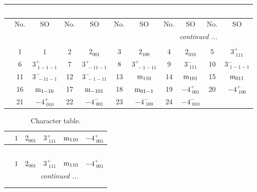 \documentclass[fleqn,10pt,landscape]{article}
\begin{document}
\begin{itemize}
\begin{center}
\begin{longtable}{c|cc|cc|cc|cc|cc}
\multicolumn{10}{l}{\tablename\ \thetable{}} \\
 \hline \hline
 & No. & SO & No. & SO & No. & SO & No. & SO & No. & SO \\ \hline \endhead

 \hline \hline
\multicolumn{10}{r}{\footnotesize\it continued ...} \\ \endfoot

 \hline \hline
\multicolumn{10}{r}{} \\ \endlastfoot

 & 1 & $1$ & 2 & $2{}_{001}$ & 3 & $2{}_{100}$ & 4 & $2{}_{010}$ & 5 & $3^{+}_{\,\,111}$ \\
& 6 & $3^{+}_{\,\,1-1-1}$ & 7 & $3^{+}_{\,\,-11-1}$ & 8 & $3^{+}_{\,\,-1-11}$ & 9 & $3^{-}_{\,\,111}$ & 10 & $3^{-}_{\,\,1-1-1}$ \\
& 11 & $3^{-}_{\,\,-11-1}$ & 12 & $3^{-}_{\,\,-1-11}$ & 13 & ${\rm m}_{110}$ & 14 & ${\rm m}_{101}$ & 15 & ${\rm m}_{011}$ \\
& 16 & ${\rm m}_{1-10}$ & 17 & ${\rm m}_{-101}$ & 18 & ${\rm m}_{01-1}$ & 19 & $-4^{+}_{\,\,001}$ & 20 & $-4^{+}_{\,\,100}$ \\
& 21 & $-4^{+}_{\,\,010}$ & 22 & $-4^{-}_{\,\,001}$ & 23 & $-4^{-}_{\,\,100}$ & 24 & $-4^{-}_{\,\,010}$ &  &  \\
\end{longtable}
\end{center}
\begin{center}
\renewcommand{\arraystretch}{1.0}
\begin{longtable}{c|rrrrr}
\caption{Character table.}
 \\
 \hline \hline
 & $ 1 $ & $ 2{}_{001} $ & $ 3^{+}_{\,\,111} $ & $ {\rm m}_{110} $ & $ -4^{+}_{\,\,001} $ \\ \hline \endfirsthead

\multicolumn{5}{l}{\tablename\ \thetable{}} \\
 \hline \hline
 & $ 1 $ & $ 2{}_{001} $ & $ 3^{+}_{\,\,111} $ & $ {\rm m}_{110} $ & $ -4^{+}_{\,\,001} $ \\ \hline \endhead

 \hline \hline
\multicolumn{5}{r}{\footnotesize\it continued ...} \\ \endfoot

 \hline \hline
\multicolumn{5}{r}{} \\ \endlastfoot


\end{longtable}
\end{center}
\end{itemize}
\end{document}
